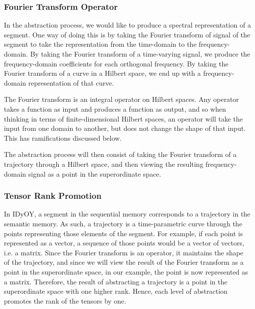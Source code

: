 \documentclass[runningheads]{llncs}
\begin{document}

\subsubsection{Fourier Transform Operator}
In the abstraction process, we would like to produce a spectral representation of a segment.  One way of doing this is by taking the Fourier transform of signal of the segment to take the representation from the time-domain to the frequency-domain.  By taking the Fourier transform of a time-varying signal, we produce the frequency-domain coefficients for each orthogonal frequency.  By taking the Fourier transform of a curve in a Hilbert space, we end up with a frequency-domain representation of that curve.

The Fourier transform is an integral operator on Hilbert spaces.  Any operator takes a function as input and produces a function as output, and so when thinking in terms of finite-dimensional Hilbert spaces, an operator will take the input from one domain to another, but does not change the shape of that input.  This has ramifications discussed below.

The abstraction process will then consist of taking the Fourier transform of a trajectory through a Hilbert space, and then viewing the resulting frequency-domain signal as a point in the superordinate space.


\subsubsection{Tensor Rank Promotion}

In IDyOY, a segment in the sequential memory corresponds to a trajectory in the semantic memory.  As such, a trajectory is a time-parametric curve through the points representing those elements of the segment.  For example, if each point is represented as a vector, a sequence of those points would be a vector of vectors, i.e. a matrix.  Since the Fourier transform is an operator, it maintains the shape of the trajectory, and since we will view the result of the Fourier transform as a point in the superordinate space, in our example, the point is now represented as a matrix.  Therefore, the result of abstracting a trajectory is a point in the superordinate space with one higher rank.  Hence, each level of abstraction promotes the rank of the tensors by one.  
\end{document}
